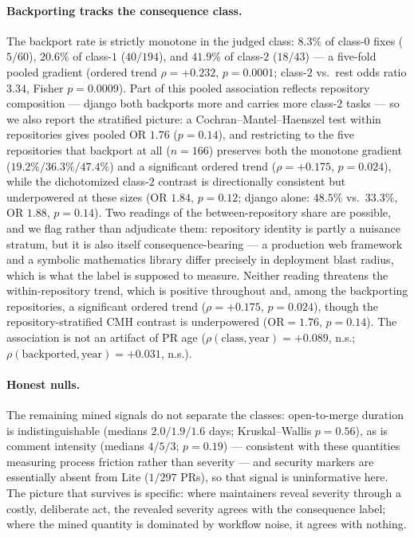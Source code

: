 \documentclass{article}
\begin{document}
\paragraph{Backporting tracks the consequence class.} The backport
rate is strictly monotone in the judged class: $8.3\%$ of class-$0$
fixes ($5/60$), $20.6\%$ of class-$1$ ($40/194$), and $41.9\%$ of
class-$2$ ($18/43$) --- a five-fold pooled gradient (ordered trend
$\rho = +0.232$, $p = 0.0001$; class-$2$ vs.\ rest odds ratio $3.34$,
Fisher $p = 0.0009$). Part of this pooled association reflects
repository composition --- django both backports more and carries
more class-$2$ tasks --- so we also report the stratified picture:
a Cochran--Mantel--Haenszel test within repositories gives pooled
OR $1.76$ ($p = 0.14$), and restricting to the five repositories that
backport at all ($n = 166$) preserves both the monotone gradient
($19.2\% / 36.3\% / 47.4\%$) and a significant ordered trend
($\rho = +0.175$, $p = 0.024$), while the dichotomized class-$2$
contrast is directionally consistent but underpowered at these sizes
(OR $1.84$, $p = 0.12$; django alone: $48.5\%$ vs.\ $33.3\%$,
OR $1.88$, $p = 0.14$). Two readings of the between-repository share
are possible, and we flag rather than adjudicate them: repository
identity is partly a nuisance stratum, but it is also itself
consequence-bearing --- a production web framework and a symbolic
mathematics library differ precisely in deployment blast radius, which
is what the label is supposed to measure. Neither reading threatens
the within-repository trend, which is positive throughout and, among
the backporting repositories, a significant ordered trend
($\rho = +0.175$, $p = 0.024$), though the repository-stratified CMH
contrast is underpowered ($\mathrm{OR} = 1.76$, $p = 0.14$).
The association is not an artifact of PR age
($\rho(\mathrm{class}, \mathrm{year}) = +0.089$, n.s.;
$\rho(\mathrm{backported}, \mathrm{year}) = +0.031$, n.s.).

\paragraph{Honest nulls.} The remaining mined signals do not
separate the classes: open-to-merge duration is indistinguishable
(medians $2.0 / 1.9 / 1.6$ days; Kruskal--Wallis $p = 0.56$), as is
comment intensity (medians $4 / 5 / 3$; $p = 0.19$) --- consistent
with these quantities measuring process friction rather than severity
--- and security markers are essentially absent from Lite ($1/297$
PRs), so that signal is uninformative here. The picture that
survives is specific: where maintainers reveal severity through a
costly, deliberate act, the revealed severity agrees with the
consequence label; where the mined quantity is dominated by workflow
noise, it agrees with nothing.
\end{document}
